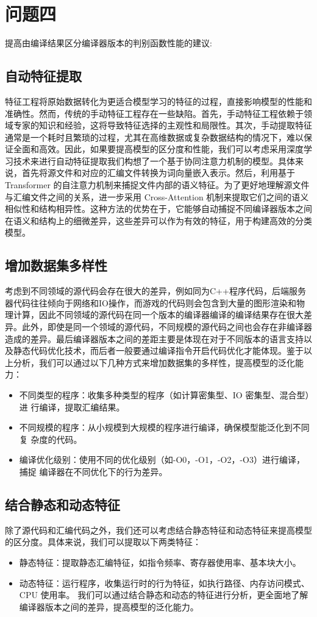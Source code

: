 \section{问题四}
提高由编译结果区分编译器版本的判别函数性能的建议:
\vspace*{1cm}
\subsection{自动特征提取}
特征工程将原始数据转化为更适合模型学习的特征的过程，直接影响模型的性能和准确性。然而，传统的手动特征工程存在一些缺陷。首先，手动特征工程依赖于领域专家的知识和经验，这将导致特征选择的主观性和局限性。其次，手动提取特征通常是一个耗时且繁琐的过程，尤其在高维数据或复杂数据结构的情况下，难以保证全面和高效。因此，如果要提高模型的区分度和性能，我们可以考虑采用深度学习技术来进行自动特征提取我们构想了一个基于协同注意力机制的模型。具体来说，首先将源文件和对应的汇编文件转换为词向量嵌入表示。然后，利用基于 Transformer 的自注意力机制来捕捉文件内部的语义特征。为了更好地理解源文件与汇编文件之间的关系，进一步采用 Cross-Attention 机制来提取它们之间的语义相似性和结构相异性。这种方法的优势在于，它能够自动捕捉不同编译器版本之间在语义和结构上的细微差异，这些差异可以作为有效的特征，用于构建高效的分类模型。
\vspace{1cm}
\subsection{增加数据集多样性}
考虑到不同领域的源代码会存在很大的差异，例如同为C++程序代码，后端服务器代码往往倾向于网络和IO操作，而游戏的代码则会包含到大量的图形渲染和物理计算，因此不同领域的源代码在同一个版本的编译器编译的编译结果存在很大差异。此外，即使是同一个领域的源代码，不同规模的源代码之间也会存在非编译器造成的差异。最后编译器版本之间的差距主要是体现在对于不同版本的语言支持以及静态代码优化技术，而后者一般要通过编译指令开启代码优化才能体现。鉴于以上分析，我们可以通过以下几种方式来增加数据集的多样性，提高模型的泛化能力：
\begin{itemize}
    \item 不同类型的程序：收集多种类型的程序（如计算密集型、IO 密集型、混合型）进
    行编译，提取汇编结果。
    \item 不同规模的程序：从小规模到大规模的程序进行编译，确保模型能泛化到不同复
    杂度的代码。
    \item 编译优化级别：使用不同的优化级别（如-O0，-O1，-O2，-O3）进行编译，捕捉
    编译器在不同优化下的行为差异。
\end{itemize}
\vspace*{1cm}
\subsection{结合静态和动态特征}
除了源代码和汇编代码之外，我们还可以考虑结合静态特征和动态特征来提高模型的区分度。具体来说，我们可以提取以下两类特征：
\begin{itemize}
    \item 静态特征：提取静态汇编特征，如指令频率、寄存器使用率、基本块大小。
    \item 动态特征：运行程序，收集运行时的行为特征，如执行路径、内存访问模式、CPU
    使用率。
 我们可以通过结合静态和动态的特征进行分析，更全面地了解编译器版本之间的差异，提高模型的泛化能力。
\end{itemize}
